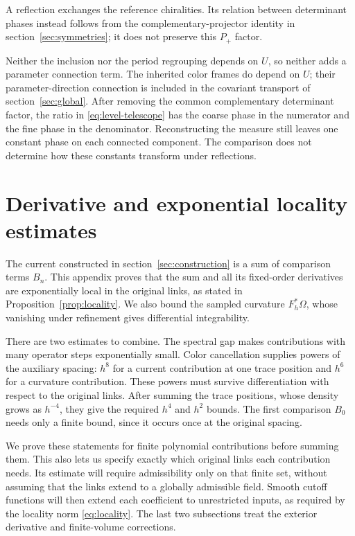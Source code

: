 \documentclass[11pt,a4paper]{article}
\theoremstyle{remark}
\begin{document}
A reflection exchanges the reference chiralities. Its relation between
determinant phases instead follows from the complementary-projector
identity in section~\ref{sec:symmetries}; it does not preserve this
$P_+$ factor.

Neither the inclusion nor the period regrouping depends on $U$, so
neither adds a parameter connection term. The inherited color frames
do depend on $U$; their parameter-direction connection is included
in the covariant transport of section~\ref{sec:global}. After removing
the common complementary determinant factor, the ratio in
\eqref{eq:level-telescope} has the coarse phase in the numerator
and the fine phase in the denominator. Reconstructing the measure still
leaves one constant phase on each connected component. The comparison
does not determine how these constants transform under reflections.

\section{Derivative and exponential locality estimates}
\label{app:a:locality}

The current constructed in section~\ref{sec:construction} is a sum of
comparison terms $B_n$. This appendix proves that the sum and all its
fixed-order derivatives are exponentially local in the original links,
as stated in Proposition~\ref{prop:locality}. We also bound the sampled
curvature $F_h^*\Omega$, whose vanishing under refinement gives
differential integrability.

There are two estimates to combine. The spectral gap makes contributions
with many operator steps exponentially small. Color cancellation supplies
powers of the auxiliary spacing: $h^8$ for a current contribution at
one trace position and $h^6$ for a curvature contribution. These powers
must survive differentiation with respect to the original links. After
summing the trace positions, whose density grows as $h^{-4}$, they give
the required $h^4$ and $h^2$ bounds. The first comparison $B_0$ needs
only a finite bound, since it occurs once at the original spacing.

We prove these statements for finite polynomial contributions before
summing them. This also lets us specify exactly which original links
each contribution needs. Its estimate will require admissibility only
on that finite set, without assuming that the links extend to a globally
admissible field. Smooth cutoff functions will then extend each
coefficient to unrestricted inputs, as required by the locality norm
\eqref{eq:locality}. The last two subsections treat the exterior
derivative and finite-volume corrections.
\end{document}
